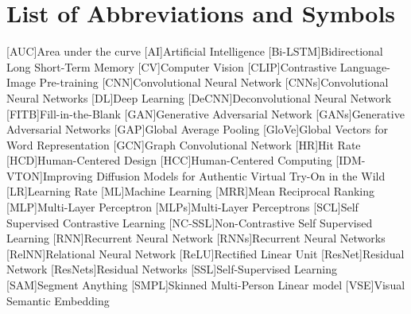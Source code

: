 \documentclass[a4paper,12pt,twoside]{scrreprt}
\begin{document}
\newpage


\newpage


\cleardoublepage
\tableofcontents

\clearpage
{}
{}
\listoffigures

\clearpage
{}
{}
\listoftables

\clearpage
{}
{}
\chapter*{List of Abbreviations and Symbols}
\begin{acronym}[ML]
 [AUC]{Area under the curve}
 [AI]{Artificial Intelligence}
 [Bi-LSTM]{Bidirectional Long Short-Term Memory}
 [CV]{Computer Vision}
 [CLIP]{Contrastive Language-Image Pre-training}
 [CNN]{Convolutional Neural Network}
 [CNNs]{Convolutional Neural Networks}
 [DL]{Deep Learning}
 [DeCNN]{Deconvolutional Neural Network}
 [FITB]{Fill-in-the-Blank}
 [GAN]{Generative Adversarial Network}
 [GANs]{Generative Adversarial Networks}
 [GAP]{Global Average Pooling}
 [GloVe]{Global Vectors for Word Representation}
 [GCN]{Graph Convolutional Network}
 [HR]{Hit Rate}
 [HCD]{Human-Centered Design}
 [HCC]{Human-Centered Computing}
 [IDM-VTON]{Improving Diffusion Models for Authentic Virtual Try-On in the Wild}
 [LR]{Learning Rate}
 [ML]{Machine Learning}
 [MRR]{Mean Reciprocal Ranking}
 [MLP]{Multi-Layer Perceptron}
 [MLPs]{Multi-Layer Perceptrons}
 [SCL]{Self Supervised Contrastive Learning}
 [NC-SSL]{Non-Contrastive Self Supervised Learning}
 [RNN]{Recurrent Neural Network}
 [RNNs]{Recurrent Neural Networks}
 [RelNN]{Relational Neural Network}
 [ReLU]{Rectified Linear Unit}
 [ResNet]{Residual Network}
 [ResNets]{Residual Networks}
 [SSL]{Self-Supervised Learning}
 [SAM]{Segment Anything}
 [SMPL]{Skinned Multi-Person Linear model}
 [VSE]{Visual Semantic Embedding}
\end{acronym}
\end{document}
